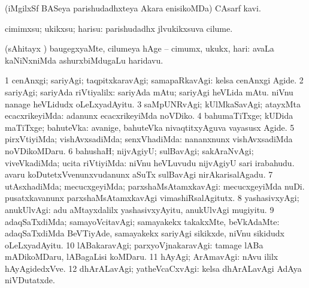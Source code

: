 {{{\noindent 
\gl{\pagu}
\expl{}
\bmng
{} (iMgilxSf BASeya parishudadhxteya Akara enisikoMDa) CAsarf kavi. 
\emng
\eentry

\bentry
{} 
\gl{\sakirx}
\expl{}
\bmng
cimimxsu; ukikxsu; harisu:  parishudadhx jlvukikxsuva cilume. 
\emng

\noindent 
\gl{\akirx}
\expl{}
\bmng
(sAhitayx \parx) baugegxyaMte, cilumeya hAge -- cimumx, ukukx, hari:  avaLa kaNiNxniMda ashurxbiMdugaLu haridavu. 
\emng
\eentry

\bentry
{} 
\gl{\kirxvi}
\bmng
\bnum
\num{1} cenAnxgi; sariyAgi; taqpitxkaravAgi; samapaRkavAgi:  kelsa cenAnxgi Agide. 
\num{2} sariyAgi; sariyAda riVtiyalilx:  sariyAda mAtu; sariyAgi heVLida mAtu.  niVnu nanage heVLidudx oLeLxyadAyitu. 
\num{3} saMpUNRvAgi; kUlMkaSavAgi; atayxMta ecacxrikeyiMda:  adanunx ecacxrikeyiMda noVDiko. 
\num{4} bahumaTiTxge; kUDida maTiTxge; bahuteVka:  avanige, bahuteVka nivaqtitxyAguva vayasusx Agide. 
\num{5} pirxVtiyiMda; vishAvxsadiMda; senxVhadiMda:  nananxnunx vishAvxsadiMda noVDikoMDaru. 
\num{6} bahushaH; nijvAgiyU; sulBavAgi; sakAraNvAgi; viveVkadiMda; ucita riVtiyiMda:  niVnu heVLuvudu nijvAgiyU sari irabahudu.  avaru koDutetxVvenunxvudanunx aSuTx sulBavAgi nirAkarisalAgadu. 
\num{7} utAsxhadiMda; mecucxgeyiMda; parxshaMsAtamxkavAgi:  mecucxgeyiMda nuDi.  pusatxkavanunx parxshaMsAtamxkavAgi vimashiRsalAgitutx. 
\num{8} yashasivxyAgi; anukUlvAgi:  adu aMtayxdalilx yashasivxyAyitu, anukUlvAgi mugiyitu. 
\num{9} adaqSaTxdiMda; samayoVcitavAgi; samayakekx takakxMte, beVkAdaMte:  adaqSaTxdiMda BeVTiyAde, samayakekx sariyAgi sikikxde, niVnu sikidudx oLeLxyadAyitu. 
\num{10} lABakaravAgi; parxyoVjnakaravAgi:  tamage lABa mADikoMDaru, lABagaLisi koMDaru. 
\num{11} hAyAgi; ArAmavAgi:  nAvu ililx hAyAgidedxVve. 
\num{12} dhArALavAgi; yatheVcaCxvAgi:  kelsa dhArALavAgi AdAya niVDutatxde. 
\enum
\emng

}}}
